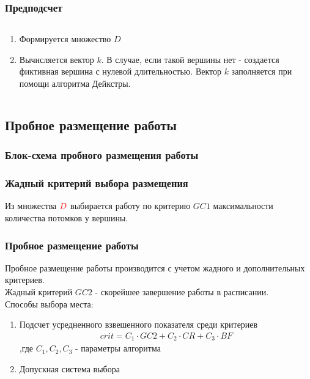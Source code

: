 \begin{frame}
    \frametitle{Предподсчет}
    \begin{columns}
        \begin{column}{0.6\textwidth}
            \begin{enumerate}
                \item Формируется множество $D$
                \item Вычисляется вектор $k$. В случае, если такой вершины нет - создается фиктивная вершина с нулевой длительностью. Вектор $k$ заполняется при помощи алгоритма Дейкстры.
            \end{enumerate}
        \end{column}
        \begin{column}{0.4\textwidth}
        \end{column}
    \end{columns}
\end{frame}


\subsection{Пробное размещение работы}
\begin{frame}
    \frametitle{Блок-схема пробного размещения работы}
    {\tiny
    }
\end{frame}

\begin{frame}
    \frametitle{Жадный критерий выбора размещения}
    Из множества $\color{red}D$ выбирается работу по критерию $GC1$ максимальности количества потомков у вершины.
\end{frame}

\begin{frame}
    \frametitle{Пробное размещение работы}
    Пробное размещение работы производится с учетом  жадного и дополнительных критериев. \\
    Жадный критерий $GC2$ - скорейшее завершение работы в расписании. \\
    Способы выбора места:
    \begin{enumerate}
        \item Подсчет усредненного взвешенного показателя среди критериев \\
              \begin{gather*}
                  crit = C_1 \cdot GC2 + C_2 \cdot CR + C_3 \cdot BF
              \end{gather*}
              ,где $C_1, C_2, C_3$ - параметры алгоритма
        \item Допускная система выбора
    \end{enumerate}
\end{frame}

